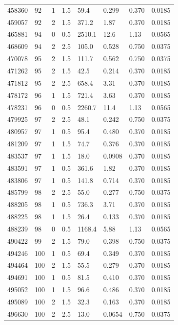 \documentclass[preview]{standalone}
\begin{document}
{{{{{{\begin{tabular}{L{1.2cm}C{1.2cm} C{0.3cm}C{0.5cm} C{1.4cm}C{1.4cm} C{1.4cm}C{1.4cm}}
  458360  &    92  & 1     & 1.5 &  59.4  & 0.299  & 0.370 &  0.0185   \\ 
  459057  &    92  & 2     & 1.5 &  371.2  & 1.87  & 0.370 &  0.0185   \\ 
  465881  &    94  & 0     & 0.5 &  2510.1  & 12.6  & 1.13 &  0.0565   \\ 
  468609  &    94  & 2     & 2.5 &  105.0  & 0.528  & 0.750 &  0.0375   \\ 
  470078  &    95  & 2     & 1.5 &  111.7  & 0.562  & 0.750 &  0.0375   \\ 
  471262  &    95  & 2     & 1.5 &  42.5  & 0.214  & 0.370 &  0.0185   \\ 
  471812  &    95  & 2     & 2.5 &  658.4  & 3.31  & 0.370 &  0.0185   \\ 
  478172  &    96  & 1     & 1.5 &  721.4  & 3.63  & 0.370 &  0.0185   \\ 
  478231  &    96  & 0     & 0.5 &  2260.7  & 11.4  & 1.13 &  0.0565   \\ 
  479925  &    97  & 2     & 2.5 &  48.1  & 0.242  & 0.750 &  0.0375   \\ 
  480957  &    97  & 1     & 0.5 &  95.4  & 0.480  & 0.370 &  0.0185   \\ 
  481209  &    97  & 1     & 1.5 &  74.7  & 0.376  & 0.370 &  0.0185   \\ 
  483537  &    97  & 1     & 1.5 &  18.0  & 0.0908  & 0.370 &  0.0185   \\ 
  483591  &    97  & 1     & 0.5 &  361.6  & 1.82  & 0.370 &  0.0185   \\ 
  483806  &    97  & 1     & 0.5 &  141.8  & 0.714  & 0.370 &  0.0185   \\ 
  485799  &    98  & 2     & 2.5 &  55.0  & 0.277  & 0.750 &  0.0375   \\ 
  488205  &    98  & 1     & 0.5 &  736.3  & 3.71  & 0.370 &  0.0185   \\ 
  488225  &    98  & 1     & 1.5 &  26.4  & 0.133  & 0.370 &  0.0185   \\ 
  488239  &    98  & 0     & 0.5 &  1168.4  & 5.88  & 1.13 &  0.0565   \\ 
  490422  &    99  & 2     & 1.5 &  79.0  & 0.398  & 0.750 &  0.0375   \\ 
  494246  &   100  & 1     & 0.5 &  69.4  & 0.349  & 0.370 &  0.0185   \\ 
  494464  &   100  & 2     & 1.5 &  55.5  & 0.279  & 0.370 &  0.0185   \\ 
  494691  &   100  & 1     & 0.5 &  81.5  & 0.410  & 0.370 &  0.0185   \\ 
  495052  &   100  & 1     & 1.5 &  96.6  & 0.486  & 0.370 &  0.0185   \\ 
  495089  &   100  & 2     & 1.5 &  32.3  & 0.163  & 0.370 &  0.0185   \\ 
  496630  &   100  & 2     & 2.5 &  13.0  & 0.0654  & 0.750 &  0.0375   \\ 
\hline 
\end{tabular} 

}}}}}}
\end{document}
